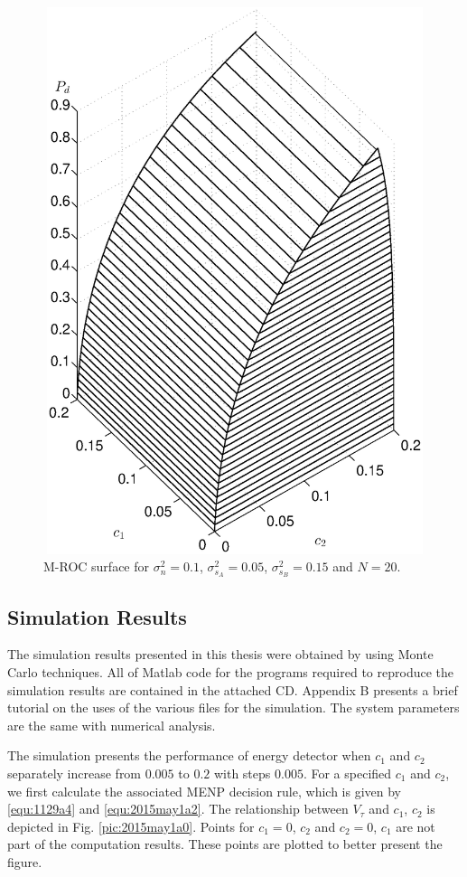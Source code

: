 \begin{figure}[!t]
\centering
\includegraphics[width=12cm, height=16cm]{4/mathc1c2pd.eps}
\caption{M-ROC surface for $\sigma_n^2 = 0.1$, $\sigma_{s_A}^2=0.05$, $\sigma_{s_B}^2=0.15$ and $N = 20$.}
\label{pic:1201a1}
\end{figure}

\subsection{Simulation Results}
The simulation results presented in this thesis were obtained by using Monte Carlo techniques. All of Matlab code for the programs required to reproduce the simulation results are contained in the attached CD. Appendix B presents a brief tutorial on the uses of the various files for the simulation. The system parameters are the same with numerical analysis.

The simulation presents the performance of energy detector when $c_1$ and $c_2$ separately increase from $0.005$ to $0.2$ with steps $0.005$. For a specified $c_1$ and $c_2$, we first calculate the associated MENP decision rule, which is given by \eqref{equ:1129a4} and \eqref{equ:2015may1a2}. 
The relationship between $V_\tau$ and $c_1$, $c_2$ is depicted in Fig. \ref{pic:2015may1a0}.   Points for  $c_1 = 0$, $c_2$ and $c_2 = 0$, $c_1$ are not part of the computation results. These points are plotted to better present the figure.  %

